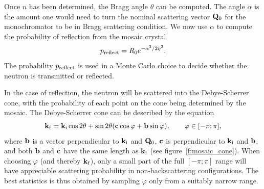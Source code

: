 Once $n$ has been determined, the Bragg angle $\theta$ can be
computed. The angle $\alpha$ is the amount one would need to
turn the nominal scattering vector ${\bf Q}_0$ for the monochromator
to be in Bragg scattering condition.
We now use $\alpha$ to compute the probability of reflection from
the mosaic crystal
\begin{equation}
p_{\rm reflect} = R_0 e^{-\alpha^2/2\eta^2},
\end{equation}
The probability $p_{\rm reflect}$ is used
in a Monte Carlo choice to decide whether the neutron is transmitted or
reflected.
%

In the case of reflection, the neutron will be scattered into the
Debye-Scherrer cone, with the probability of each point on the cone
being determined by the mosaic. The Debye-Scherrer cone can be described
by the equation
\begin{equation}
  \label{eq:mosaic_cone}
  {\bf k}_{\rm f} = {\bf k}_{\rm i}\cos2\theta +
      \sin2\theta({\bf c}\cos\varphi + {\bf b}\sin\varphi),
      \qquad\varphi\in[-\pi;\pi],
\end{equation}
where ${\bf b}$ is a vector perpendicular to ${\bf k}_{\rm i}$ and ${\bf
Q}_0$, ${\bf c}$ is perpendicular to ${\bf k}_{\rm i}$ and ${\bf b}$,
and both ${\bf b}$ and ${\bf c}$ have the same length as ${\bf k}_{\rm i}$
(see figure~\ref{f:mosaic_cone}). When choosing $\varphi$ (and
thereby ${\bf k}_{\rm f}$), only a small part of the full $[-\pi; \pi]$
range will have appreciable scattering probability in non-backscattering
configurations. The best statistics is thus obtained by sampling
$\varphi$ only from a suitably narrow range.

